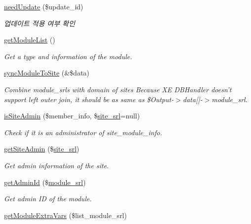 \begin{DoxyCompactItemize}
\item 
\hyperlink{classmoduleModel_a4841df3865fb0937cb817c03fcb3d4b3}{need\-Update} (\$update\-\_\-id)
\begin{DoxyCompactList}\small\item\em 업데이트 적용 여부 확인 \end{DoxyCompactList}\item 
\hyperlink{classmoduleModel_af51708f2ce0243f482bc92a453dd27c4}{get\-Module\-List} ()
\begin{DoxyCompactList}\small\item\em Get a type and information of the module. \end{DoxyCompactList}\item 
\hyperlink{classmoduleModel_ab51d556817682d653b92e09a34b138d6}{sync\-Module\-To\-Site} (\&\$data)
\begin{DoxyCompactList}\small\item\em Combine module\-\_\-srls with domain of sites Because X\-E D\-B\-Handler doesn't support left outer join, it should be as same as \$\-Output-\/$>$data\mbox{[}\mbox{]}-\/$>$module\-\_\-srl. \end{DoxyCompactList}\item 
\hyperlink{classmoduleModel_aae55c42d2818ffd09f81d6cb215c59ff}{is\-Site\-Admin} (\$member\-\_\-info, \$\hyperlink{ko_8install_8php_a8b1406b4ad1048041558dce6bfe89004}{site\-\_\-srl}=null)
\begin{DoxyCompactList}\small\item\em Check if it is an administrator of site\-\_\-module\-\_\-info. \end{DoxyCompactList}\item 
\hyperlink{classmoduleModel_a6baa2faf83fc96fba51072276c9cb7c3}{get\-Site\-Admin} (\$\hyperlink{ko_8install_8php_a8b1406b4ad1048041558dce6bfe89004}{site\-\_\-srl})
\begin{DoxyCompactList}\small\item\em Get admin information of the site. \end{DoxyCompactList}\item 
\hyperlink{classmoduleModel_a302d180d2acef6331f9123d60f76c8c1}{get\-Admin\-Id} (\$\hyperlink{ko_8install_8php_a370bb6450fab1da3e0ed9f484a38b761}{module\-\_\-srl})
\begin{DoxyCompactList}\small\item\em Get admin I\-D of the module. \end{DoxyCompactList}\item 
\hyperlink{classmoduleModel_a4e93226573048a7b9c8e2cb842d0cb30}{get\-Module\-Extra\-Vars} (\$list\-\_\-module\-\_\-srl)

\end{DoxyCompactItemize}
